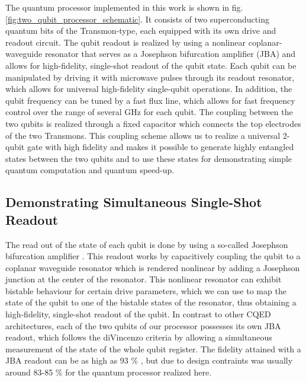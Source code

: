 The quantum processor implemented in this work is shown in fig. \ref{fig:two_qubit_processor_schematic}. It consists of two superconducting quantum bits of the Transmon-type, each equipped with its own drive and readout circuit. The qubit readout is realized by using a nonlinear coplanar-waveguide resonator that serves as a Josephson bifurcation amplifier (JBA) and allows for high-fidelity, single-shot readout of the qubit state. Each qubit can be manipulated by driving it with microwave pulses through its readout resonator, which allows for universal high-fidelity single-qubit operations. In addition, the qubit frequency can be tuned by a fast flux line, which allows for fast frequency control over the range of several GHz for each qubit. The coupling between the two qubits is realized through a fixed capacitor which connects the top electrodes of the two Transmons. This coupling scheme allows us to realize a universal 2-qubit gate with high fidelity and makes it possible to generate highly entangled states between the two qubits and to use these states for demonstrating simple quantum computation and quantum speed-up.

\subsection{Demonstrating Simultaneous Single-Shot Readout}


The read out of the state of each qubit is done by using a so-called Josephson bifurcation amplifier \citep{siddiqi_dispersive_2006,mallet_single-shot_2009}. This readout works by capacitively coupling the qubit to a coplanar waveguide resonator which is rendered nonlinear by adding a Josephson junction at the center of the resonator. This nonlinear resonator can exhibit bistable behaviour for certain drive parameters, which we can use to map the state of the qubit to one of the bistable states of the resonator, thus obtaining a high-fidelity, single-shot readout of the qubit. In contrast to other CQED architectures, each of the two qubits of our processor possesses its own JBA readout, which follows the diVincenzo criteria by allowing a simultaneous measurement of the state of the whole qubit register. The fidelity attained with a JBA readout can be as high as 93 \% \citep{mallet_single-shot_2009}, but due to design contraints was usually around 83-85 \% for the quantum processor realized here.

